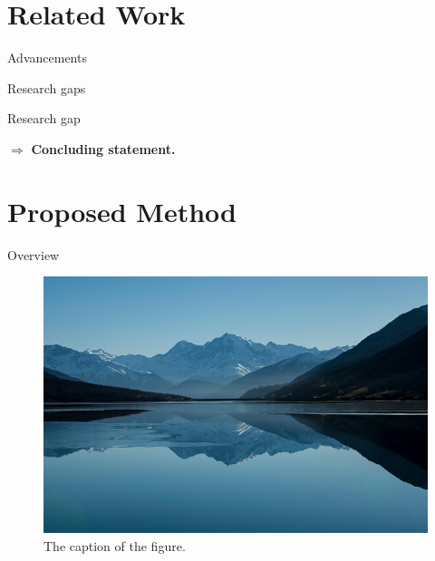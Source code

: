 \documentclass[presentation, aspectratio=169]{beamer}
\begin{document}
\section{Related Work}

\begin{frame}{Advancements}
	\note{}
\end{frame}

\begin{frame}{Research gaps}
	\begin{alertblock}{Research gap}
	\end{alertblock}
																
	$\Rightarrow$ \textbf{Concluding statement.}
																
	\note{}
\end{frame}

		 
\section{Proposed Method} 

\begin{frame}{Overview}
	\begin{figure}
		\centering
		\includegraphics[width=.8\linewidth]{samplel.png}
		\caption{The caption of the figure.}
	\end{figure}	
	\note{}
\end{frame}
\end{document}
